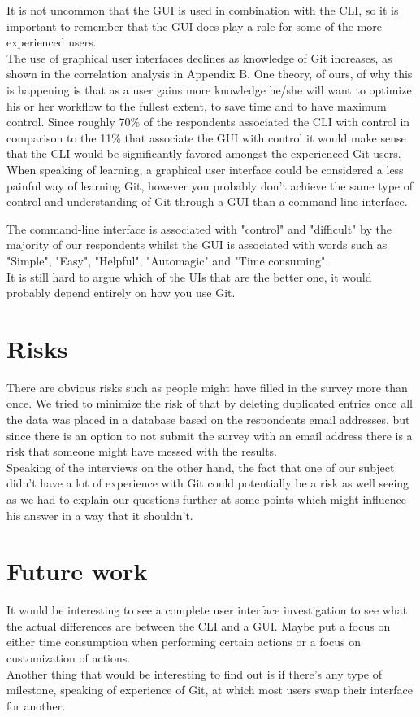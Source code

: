 \documentclass[a4paper,oneside]{bth} %
\begin{document}
		It is not uncommon that the GUI is used in combination with the CLI, so it is important to remember that the GUI does play a role for some of the more experienced users.\\
		The use of graphical user interfaces declines as knowledge of Git increases, as shown in the correlation analysis in Appendix B.
		One theory, of ours, of why this is happening is that as a user gains more knowledge he/she will want to optimize his or her workflow to the fullest extent, to save time and to have maximum control. Since roughly 70\% of the respondents associated the CLI with control in comparison to the 11\% that associate the GUI with control it would make sense that the CLI would be significantly favored amongst the experienced Git users.\\
		When speaking of learning, a graphical user interface could be considered a less painful way of learning Git, however you probably don't achieve the same type of control and understanding of Git through a GUI than a command-line interface.
		
		The command-line interface is associated with "control" and "difficult" by the majority of our respondents whilst the GUI is associated with words such as "Simple", "Easy", "Helpful", "Automagic" and "Time consuming".\\
		It is still hard to argue which of the UIs that are the better one, it would probably depend entirely on how you use Git.\\
		
		
		\chapter{Risks}
		There are obvious risks such as people might have filled in the survey more than once. We tried to minimize the risk of that by deleting duplicated entries once all the data was placed in a database based on the respondents email addresses, but since there is an option to not submit the survey with an email address there is a risk that someone might have messed with the results.\\
		Speaking of the interviews on the other hand, the fact that one of our subject didn't have a lot of experience with Git could potentially be a risk as well seeing as we had to explain our questions further at some points which might influence his answer in a way that it shouldn't.
		
		\chapter{Future work}
		It would be interesting to see a complete user interface investigation to see what the actual differences are between the CLI and a GUI. Maybe put a focus on either time consumption when performing certain actions or a focus on customization of actions.\\
		Another thing that would be interesting to find out is if there's any type of milestone, speaking of experience of Git, at which most users swap their interface for another.
		
\end{document}
